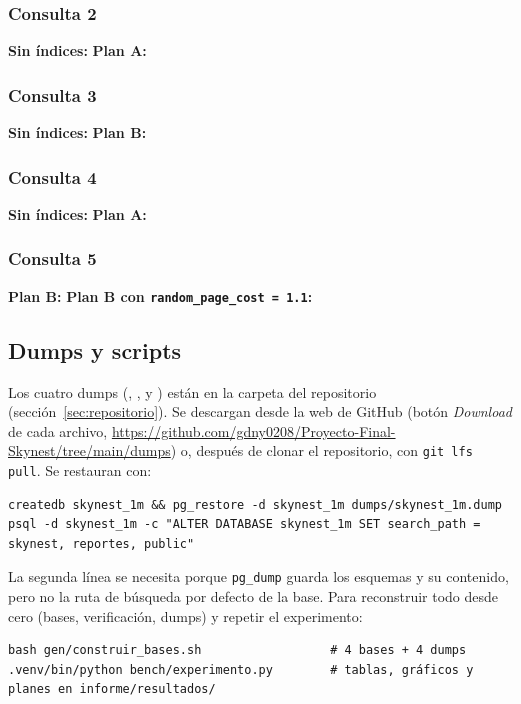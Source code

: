 \subsubsection*{Consulta 2}
\textbf{Sin índices:}
\textbf{Plan A:}
\subsubsection*{Consulta 3}
\textbf{Sin índices:}
\textbf{Plan B:}
\subsubsection*{Consulta 4}
\textbf{Sin índices:}
\textbf{Plan A:}
\subsubsection*{Consulta 5}
\textbf{Plan B:}
\textbf{Plan B con \texttt{random\_page\_cost = 1.1}:}

\subsection{Dumps y scripts}
Los cuatro dumps (, ,  y ) están en la carpeta  del repositorio (sección~\ref{sec:repositorio}). Se descargan desde la web de GitHub (botón \emph{Download} de cada archivo, \url{https://github.com/gdny0208/Proyecto-Final-Skynest/tree/main/dumps}) o, después de clonar el repositorio, con \texttt{git lfs pull}. Se restauran con:
\begin{lstlisting}[style=salida]
createdb skynest_1m && pg_restore -d skynest_1m dumps/skynest_1m.dump
psql -d skynest_1m -c "ALTER DATABASE skynest_1m SET search_path = skynest, reportes, public"
\end{lstlisting}
La segunda línea se necesita porque \texttt{pg\_dump} guarda los esquemas y su contenido, pero no la ruta de búsqueda por defecto de la base.
Para reconstruir todo desde cero (bases, verificación, dumps) y repetir el experimento:
\begin{lstlisting}[style=salida]
bash gen/construir_bases.sh                  # 4 bases + 4 dumps
.venv/bin/python bench/experimento.py        # tablas, gráficos y planes en informe/resultados/
\end{lstlisting}
